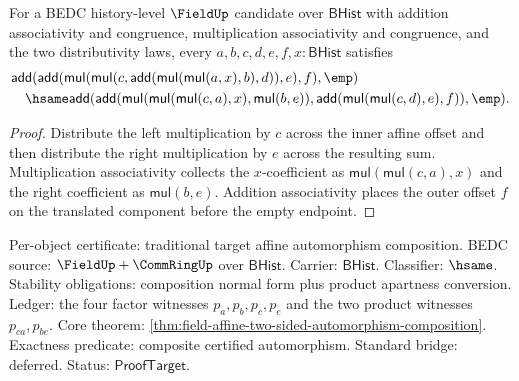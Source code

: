 \begin{theorem}
\label{thm:field-affine-composition-right-empty-normal-form}
For a BEDC history-level $\FieldUp$ candidate over $\mathsf{BHist}$ with
addition associativity and congruence, multiplication associativity and
congruence, and the two distributivity laws, every
$a,b,c,d,e,f,x:\mathsf{BHist}$ satisfies
$$
\begin{aligned}
&\mathsf{add}(
  \mathsf{add}(
    \mathsf{mul}(\mathsf{mul}(c,
      \mathsf{add}(\mathsf{mul}(\mathsf{mul}(a,x),b),d)),e),f),\emp)\\
&\quad\hsame
\mathsf{add}(
  \mathsf{add}(
    \mathsf{mul}(\mathsf{mul}(\mathsf{mul}(c,a),x),\mathsf{mul}(b,e)),
    \mathsf{add}(\mathsf{mul}(\mathsf{mul}(c,d),e),f)),\emp).
\end{aligned}
$$
\end{theorem}
\begin{proof}
Distribute the left multiplication by $c$ across the inner affine offset and
then distribute the right multiplication by $e$ across the resulting sum.
Multiplication associativity collects the $x$-coefficient as
$\mathsf{mul}(\mathsf{mul}(c,a),x)$ and the right coefficient as
$\mathsf{mul}(b,e)$. Addition associativity places the outer offset $f$ on the
translated component before the empty endpoint.
\end{proof}

Per-object certificate: traditional target affine automorphism composition.
BEDC source: $\FieldUp+\CommRingUp$ over $\mathsf{BHist}$. Carrier:
$\mathsf{BHist}$. Classifier: $\hsame$. Stability obligations: composition
normal form plus product apartness conversion. Ledger: the four factor
witnesses $p_a,p_b,p_c,p_e$ and the two product witnesses $p_{ca},p_{be}$.
Core theorem: \autoref{thm:field-affine-two-sided-automorphism-composition}.
Exactness predicate: composite certified automorphism. Standard bridge:
deferred. Status: $\mathsf{ProofTarget}$.
